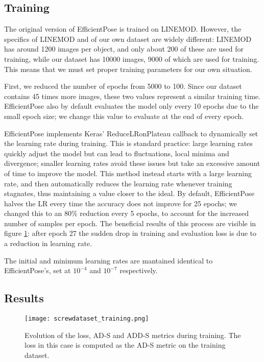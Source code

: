 \subsection{Training}

The original version of EfficientPose is trained on LINEMOD. However, the specifics of LINEMOD and of our own dataset are widely different: LINEMOD has around 1200 images per object, and only about 200 of these are used for training, while our dataset has 10000 images, 9000 of which are used for training. This means that we must set proper training parameters for our own situation.

First, we reduced the number of epochs from 5000 to 100. Since our dataset contains 45 times more images, these two values represent a similar training time. EfficientPose also by default evaluates the model only every 10 epochs due to the small epoch size; we change this value to evaluate at the end of every epoch.

EfficientPose implements Keras' ReduceLRonPlateau callback to dynamically set the learning rate during training. This is standard practice: large learning rates quickly adjust the model but can lead to fluctuations, local minima and divergence; smaller learning rates avoid these issues but take an excessive amount of time to improve the model\cite{ReduceLR}. This method instead starts with a large learning rate, and then automatically reduces the learning rate whenever training stagnates, thus maintaining a value closer to the ideal. By default, EfficientPose halves the LR every time the accuracy does not improve for 25 epochs; we changed this to an 80\% reduction every 5 epochs, to account for the increased number of samples per epoch. The beneficial results of this process are visible in figure \ref{fig:screwdataset_training}: after epoch 27 the sudden drop in training and evaluation loss is due to a reduction in learning rate.

The initial and minimum learning rates are mantained identical to EfficientPose's, set at $10^{-4}$ and $10^{-7}$ respectively.

\subsection{Results}

\begin{figure}[ht]
    \texttt{[image: screwdataset\_training.png]}
    \caption{Evolution of the loss, AD-S and ADD-S metrics during training. The loss in this case is computed as the AD-S metric on the training dataset.}
    \label{fig:screwdataset_training}
\end{figure}

